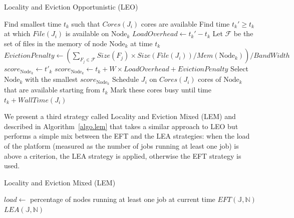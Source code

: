 \documentclass[conference,10pt]{IEEEtran}
\newcommand{\Node}[1]{\ensuremath{\mathrm{Node}_{#1}}\xspace}
\newcommand{\file}{\ensuremath{\mathit{File}}\xspace}
\newcommand{\size}{\ensuremath{\mathit{Size}}\xspace}
\newcommand{\memory}{\ensuremath{\mathit{Mem}}\xspace}
\newcommand{\bandwidth}{\mathit{BandWidth}\xspace}
\newcommand{\core}{\mathit{Cores}\xspace}
\newcommand{\walltime}{\mathit{WallTime}\xspace}
\newcommand{\jobset}{\ensuremath{\mathbb{J}}\xspace}
\newcommand{\nodeset}{\ensuremath{\mathbb{N}}\xspace}
\begin{document}
\begin{algorithm*}[htb]%
\caption{Locality and Eviction Opportunistic (LEO)}\label{algo.leo}
\begin{algorithmic}[1]
		\ForEach{$\Node{k} \in \nodeset$}
			\State Find smallest time $t_k$ such that $\core(J_i)$ cores are available
			\State Find time $t_k'\geq t_k$ at which $\file(J_i)$ is available on $\Node{k}$
			\State $\mathit{LoadOverhead} \gets t_k' - t_k$ %
                        \State Let $\mathcal{F}$ be the set of files in the memory of node \Node{k} at time $t_k$
			\State $\mathit{EvictionPenalty} \gets (\sum_{F_j\in\mathcal{F}}\size(F_j) \times \size(\file(J_i))/\memory(\Node{k}))/\bandwidth$
				\State $score_{\Node{k}} \gets t'_k$
			\Else
			         \State $score_{\Node{k}} \gets t_k + W \times \mathit{LoadOverhead} + \mathit{EvictionPenalty}$
			\EndIf
		\EndFor
                \State Select \Node{k} with the smallest $score_{\Node{k}}$
                \State Schedule $J_i$ on $\core(J_i)$ cores of \Node{k} that are available starting from $t_k$
                \State Mark these cores busy until time $t_k +\walltime(J_i)$
	\EndFor
\end{algorithmic}
\end{algorithm*}

We present a third strategy called Locality and Eviction Mixed (LEM)
and described in Algorithm~\ref{algo.lem} that takes a similar  approach to
LEO but performs a simple mix between the EFT and the LEA strategies:
when the load of the platform (measured as the number of jobs running
at least one job) is above a criterion, the LEA strategy is applied,
otherwise the EFT strategy is used.
 

\begin{algorithm}[htb]%
\caption{Locality and Eviction Mixed (LEM)}\label{algo.lem}
\begin{algorithmic}[1]
		\State $\mathit{load} \gets$  percentage of nodes running at least one job at current time
			\State $EFT(\jobset,\nodeset)$
		\Else
			\State $LEA(\jobset,\nodeset)$
		\EndIf
	\EndFor
\end{algorithmic}
\end{algorithm}
\end{document}
